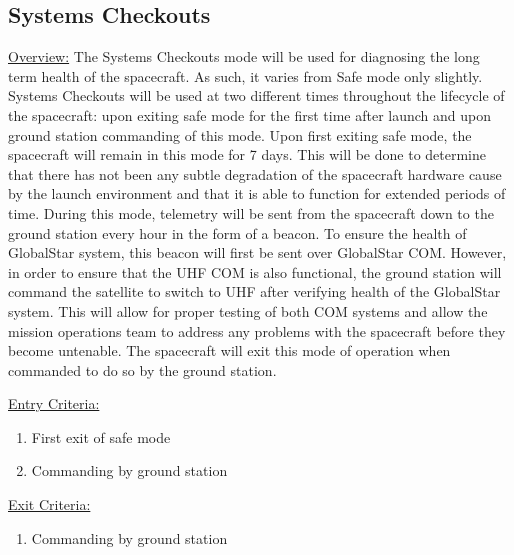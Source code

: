 \documentclass{article}
\begin{document}
\newpage

\subsection{Systems Checkouts}

\underline{Overview:} The Systems Checkouts mode will be used for diagnosing the long term health of the spacecraft. As such, it varies from Safe mode only slightly. Systems Checkouts will be used at two different times throughout the lifecycle of the spacecraft: upon exiting safe mode for the first time after launch and upon ground station commanding of this mode. Upon first exiting safe mode, the spacecraft will remain in this mode for 7 days. This will be done to determine that there has not been any subtle degradation of the spacecraft hardware cause by the launch environment and that it is able to function for extended periods of time. During this mode, telemetry will be sent from the spacecraft down to the ground station every hour in the form of a beacon. To ensure the health of GlobalStar system, this beacon will first be sent over GlobalStar COM. However, in order to ensure that the UHF COM is also functional, the ground station will command the satellite to switch to UHF after verifying health of the GlobalStar system. This will allow for proper testing of both COM systems and allow the mission operations team to address any problems with the spacecraft before they become untenable. The spacecraft will exit this mode of operation when commanded to do so by the ground station.

\underline{Entry Criteria:} 

\begin{enumerate}
\item First exit of safe mode
\item Commanding by ground station
\end{enumerate}

\underline{Exit Criteria:}

\begin{enumerate}
\item Commanding by ground station
\end{enumerate}
\end{document}
